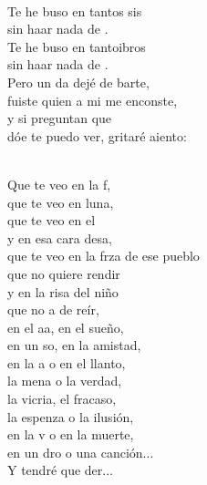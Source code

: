\begin{cancion}%
	    \\
	Te he buso en tantos sis \\
	sin haar nada de . \\
	Te he buso en tantoibros\\
	sin haar nada de . \\
	Pero un da dejé de barte, \\
	fuiste  quien a mi me enconste, \\
	y si  preguntan que \\
	dóe te puedo ver, gritaré aiento:\\\jump\\
	\begin{chorus}%
	Que te veo en la f, \\
	que te veo en luna,\\
	que te veo en el  \\
	y en esa cara desa,\\
	que te veo en la frza de ese pueblo\\
	que no  quiere rendir\\
	y en la risa del niño \\
	que no a de reír,\\
	en el aa, en el sueño, \\
	en un so, en la amistad,\\
	en la a o en el llanto, \\
	la mena o la verdad,\\
	la vicria, el fracaso, \\
	la espenza o la ilusión,\\
	en la v o en la muerte, \\
	en un dro o una canción...\\
	Y tendré que der...\\

\end{chorus}
\end{cancion}
